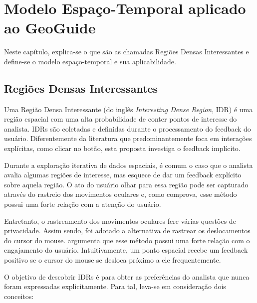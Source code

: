 \chapter{Modelo Espaço-Temporal aplicado ao GeoGuide}
\label{chap:modelo}



Neste capítulo, explica-se o que são as chamadas Regiões Densas Interessantes e define-se o modelo espaço-temporal e sua aplicabilidade.

\section{Regiões Densas Interessantes}


Uma Região Densa Interessante (do inglês {\em Interesting Dense Region}, IDR) é uma região espacial com uma alta probabilidade de conter pontos de interesse do analista. IDRs são coletadas e definidas durante o processamento do feedback do usuário. Diferentemente da literatura que predominantemente foca em interações explícitas, como clicar no botão, esta proposta investiga o feedback implícito.

Durante a exploração iterativa de dados espaciais, é comum o caso que o analista avalia algumas regiões de interesse, mas esquece de dar um feedback explícito sobre aquela região. O ato do usuário olhar para essa região pode ser capturado através do rastreio dos movimentos oculares e, como  comprova, esse método possui uma forte relação com a atenção do usuário.

Entretanto, o rastreamento dos movimentos oculares fere várias questões de privacidade. Assim sendo, foi adotado a alternativa de rastrear os deslocamentos do cursor do mouse.  argumenta que esse método possui uma forte relação com o engajamento do usuário. Intuitivamente, um ponto espacial recebe um feedback positivo se o cursor do mouse se desloca próximo a ele frequentemente.

O objetivo de descobrir IDRs é para obter as preferências do analista que nunca foram expressadas explicitamente. Para tal, leva-se em consideração dois conceitos:

